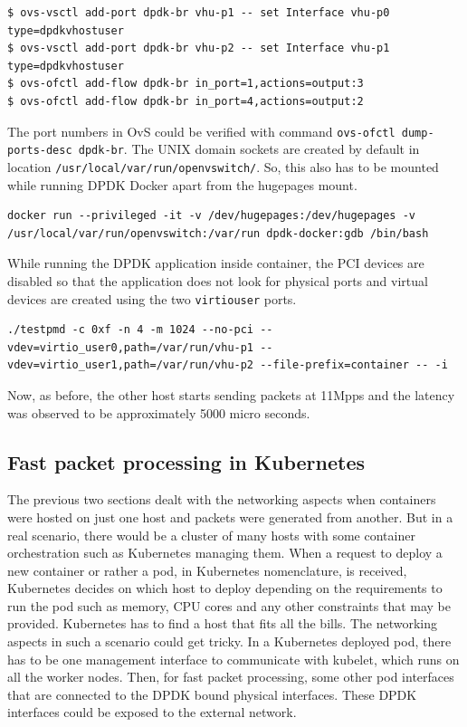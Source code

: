 \documentclass[english, 12pt, a4paper, elec, utf8, a-1b, online]{aaltothesis}
\begin{document}
\begin{lstlisting}[basicstyle={\small\ttfamily}]
$ ovs-vsctl add-port dpdk-br vhu-p1 -- set Interface vhu-p0 type=dpdkvhostuser
$ ovs-vsctl add-port dpdk-br vhu-p2 -- set Interface vhu-p1 type=dpdkvhostuser
$ ovs-ofctl add-flow dpdk-br in_port=1,actions=output:3
$ ovs-ofctl add-flow dpdk-br in_port=4,actions=output:2
\end{lstlisting}

The port numbers in OvS could be verified with command \lstinline{ovs-ofctl dump-ports-desc dpdk-br}. The UNIX domain sockets are created by default in location \lstinline{/usr/local/var/run/openvswitch/}. So, this also has to be mounted while running DPDK Docker apart from the hugepages mount.

\begin{lstlisting}[basicstyle={\small\ttfamily}]
docker run --privileged -it -v /dev/hugepages:/dev/hugepages -v /usr/local/var/run/openvswitch:/var/run dpdk-docker:gdb /bin/bash
\end{lstlisting}

While running the DPDK application inside container, the PCI devices are disabled so that the application does not look for physical ports and virtual devices are created using the two \lstinline{virtiouser} ports.

\begin{lstlisting}[basicstyle={\small\ttfamily}]
./testpmd -c 0xf -n 4 -m 1024 --no-pci --vdev=virtio_user0,path=/var/run/vhu-p1 --vdev=virtio_user1,path=/var/run/vhu-p2 --file-prefix=container -- -i
\end{lstlisting}

Now, as before, the other host starts sending packets at 11Mpps and the latency was observed to be approximately 5000 micro seconds.

\subsection{Fast packet processing in Kubernetes}
The previous two sections dealt with the networking aspects when containers were hosted on just one  host and packets were generated from another. But in a real scenario, there would be a cluster of many hosts with some container orchestration such as Kubernetes managing them. When a request to deploy a new container or rather a pod, in Kubernetes nomenclature, is received, Kubernetes decides on which host to deploy depending on the requirements to run the pod such as memory, CPU cores and any other constraints that may be provided. Kubernetes has to find a host that fits all the bills. The networking aspects in such a scenario could get tricky. In a Kubernetes deployed pod, there has to be one management interface to communicate with kubelet, which runs on all the worker nodes. Then, for fast packet processing, some other pod interfaces that are connected to the DPDK bound physical interfaces. These DPDK interfaces could be exposed to the external network.
\end{document}
